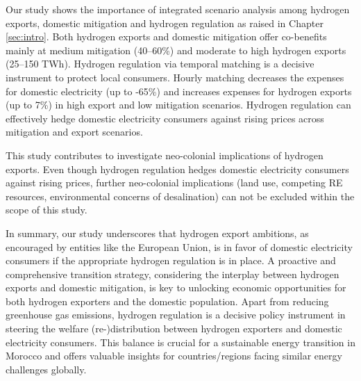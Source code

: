 



Our study shows the importance of integrated scenario analysis among hydrogen exports, domestic mitigation and hydrogen regulation as raised in Chapter \ref{sec:intro}.
Both hydrogen exports and domestic mitigation offer co-benefits mainly at medium mitigation (40--60\%) and moderate to high hydrogen exports (25--150 TWh). Hydrogen regulation via temporal matching is a decisive instrument
to protect local consumers. Hourly matching decreases the expenses for domestic electricity (up to -65\%) and increases expenses for hydrogen exports (up to 7\%) in high export and low mitigation scenarios. Hydrogen regulation can effectively hedge domestic electricity consumers against rising prices across mitigation and export scenarios. %

This study contributes to investigate neo-colonial implications of hydrogen exports. Even though hydrogen regulation hedges domestic electricity consumers against rising prices, further neo-colonial implications (land use, competing RE resources, environmental concerns of desalination) can not be excluded within the scope of this study.


In summary, our study underscores that hydrogen export ambitions, as encouraged by entities like the European Union, is in favor of domestic electricity consumers 
if the appropriate hydrogen regulation is in place. A proactive and comprehensive transition strategy, considering the interplay between hydrogen exports and domestic mitigation, is key to unlocking economic opportunities for both hydrogen exporters and the domestic population. 
Apart from reducing greenhouse gas emissions, hydrogen regulation is a decisive policy instrument in steering the welfare (re-)distribution between hydrogen exporters and domestic electricity consumers. 
This balance is crucial for a sustainable energy transition in Morocco and offers valuable insights for countries/regions facing similar energy challenges globally.



